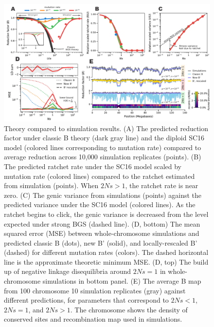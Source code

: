 \documentclass[11pt]{article}
\begin{document}
\begin{figure}[htbp] \centering
    \includegraphics[width=\textwidth]{figures/figure_1.pdf} \caption{Theory
        compared to simulation results. (A) The predicted reduction factor
        under classic B theory (dark gray line) and the diploid SC16 model
        (colored lines corresponding to mutation rate) compared to average
        reduction across 10,000 simulation replicates (points). (B) The predicted
        ratchet rate under the SC16 model scaled by mutation rate (colored
        lines) compared to the ratchet estimated from simulation (points). When
        $2Ns>1$, the ratchet rate is near zero. (C) The genic variance from
        simulations (points) against the predicted variance under the SC16
        model (colored lines). As the ratchet begins to click, the genic
        variance is decreased from the level expected under strong BGS (dashed
        line). (D, bottom) The mean squared error (MSE) between
        whole-chromosome simulations and predicted classic B (dots), new B'
        (solid), and locally-rescaled B' (dashed) for different mutation rates
        (colors). The dashed horizontal line is the approximate theoretic
        minimum MSE. (D, top) The build up of negative linkage disequilibria
        around $2Ns=1$ in whole-chromosome simulations in bottom panel. (E) The
        average B map from 100 chromosome 10 simulation replicates (gray)
    against different predictions, for parameters that correspond to $2Ns < 1$,
$2Ns = 1$, and $2Ns > 1$. The chromosome shows the density of conserved sites
and recombination map used in simulations. }
  \label{fig:figure-1}
\end{figure}
\end{document}
